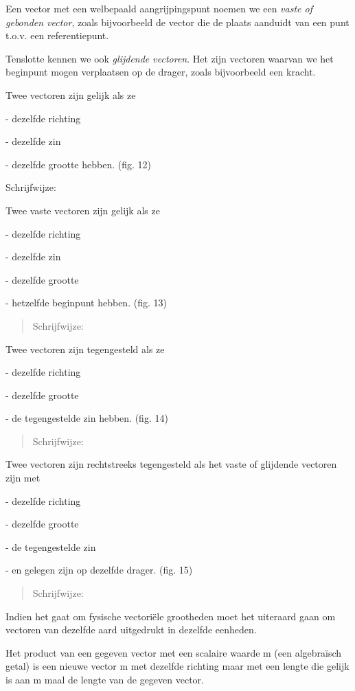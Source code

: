 \documentclass[]{article}
\begin{document}
Een vector met een welbepaald aangrijpingspunt noemen we een \emph{vaste
of gebonden vector}, zoals bijvoorbeeld de vector die de plaats aanduidt
van een punt t.o.v. een referentiepunt.

Tenslotte kennen we ook \emph{glijdende vectoren}. Het zijn vectoren
waarvan we het beginpunt mogen verplaatsen op de drager, zoals
bijvoorbeeld een kracht.

Twee vectoren zijn gelijk als ze

- dezelfde richting

- dezelfde zin

- dezelfde grootte hebben. (fig. 12)

Schrijfwijze:

Twee vaste vectoren zijn gelijk als ze

- dezelfde richting

- dezelfde zin

- dezelfde grootte

- hetzelfde beginpunt hebben. (fig. 13)

\begin{quote}
Schrijfwijze:
\end{quote}

Twee vectoren zijn tegengesteld als ze

- dezelfde richting

- dezelfde grootte

- de tegengestelde zin hebben. (fig. 14)

\begin{quote}
Schrijfwijze:
\end{quote}

Twee vectoren zijn rechtstreeks tegengesteld als het vaste of glijdende
vectoren zijn met

- dezelfde richting

- dezelfde grootte

- de tegengestelde zin

- en gelegen zijn op dezelfde drager. (fig. 15)

\begin{quote}
Schrijfwijze:
\end{quote}

Indien het gaat om fysische vectoriële grootheden moet het uiteraard
gaan om vectoren van dezelfde aard uitgedrukt in dezelfde eenheden.

Het product van een gegeven vector met een scalaire waarde m (een
algebraïsch getal) is een nieuwe vector m met dezelfde richting maar met
een lengte die gelijk is aan m maal de lengte van de gegeven vector.
\end{document}
